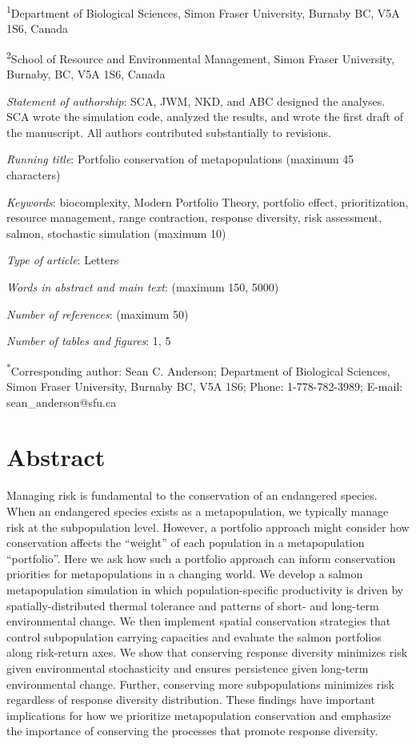 \textsuperscript{1}Department of Biological Sciences, Simon Fraser University, Burnaby BC, V5A 1S6, Canada

\textsuperscript{2}School of Resource and Environmental Management, Simon Fraser University, Burnaby, BC, V5A 1S6, Canada

\emph{Statement of authorship}: SCA, JWM, NKD, and ABC designed the analyses. SCA wrote the simulation code, analyzed the results, and wrote the first draft of the manuscript. All authors contributed substantially to revisions.

\emph{Running title}: Portfolio conservation of metapopulations (maximum 45 characters)

\emph{Keywords}: biocomplexity, Modern Portfolio Theory, portfolio effect, prioritization, resource management, range contraction, response diversity, risk assessment, salmon, stochastic simulation (maximum 10)

\emph{Type of article}: Letters

\emph{Words in abstract and main text}: (maximum 150, 5000)

\emph{Number of references}: (maximum 50)

\emph{Number of tables and figures}: 1, 5

\textsuperscript{*}Corresponding author: Sean C. Anderson; Department of Biological Sciences, Simon Fraser University, Burnaby BC, V5A 1S6; Phone: 1-778-782-3989; E-mail: sean\_anderson@sfu.ca

\section{Abstract}

Managing risk is fundamental to the conservation of an endangered species. When an endangered species exists as a metapopulation, we typically manage risk at the subpopulation level. However, a portfolio approach might consider how conservation affects the ``weight'' of each population in a metapopulation ``portfolio''. Here we ask how such a portfolio approach can inform conservation priorities for metapopulations in a changing world. We develop a salmon metapopulation simulation in which population-specific productivity is driven by spatially-distributed thermal tolerance and patterns of short- and long-term environmental change. We then implement spatial conservation strategies that control subpopulation carrying capacities and evaluate the salmon portfolios along risk-return axes. We show that conserving response diversity minimizes risk given environmental stochasticity and ensures persistence given long-term environmental change. Further, conserving more subpopulations minimizes risk regardless of response diversity distribution. These findings have important implications for how we prioritize metapopulation conservation and emphasize the importance of conserving the processes that promote response diversity.

